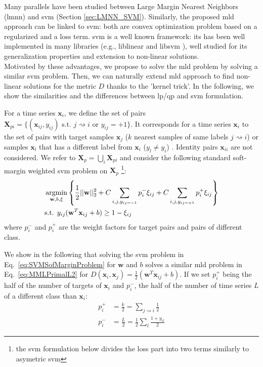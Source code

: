 Many parallels have been studied between Large Margin Nearest Neighbors ({\sc lmnn}) and {\sc svm} (Section \ref{sec:LMNN_SVM}). Similarly, the proposed {\sc mld} approach can be linked to {\sc svm}: both are convex optimization problem based on a regularized and a loss term. {\sc svm} is a well known framework: its has been well implemented in many libraries (e.g., {\sc liblinear} \cite{Fan2008} and {\sc libsvm} \cite{Hsu2008}), well studied for its generalization properties and extension to non-linear solutions. \\
\indent Motivated by these advantages, we propose to solve the {\sc mld} problem by solving a similar {\sc svm} problem. Then, we can naturally extend {\sc mld} approach to find non-linear solutions for the metric $D$ thanks to the 'kernel trick'. 
In the following, we show the similarities and the differences between {\sc lp}/{\sc qp} and {\sc svm} formulation.

For a time series $\textbf{x}_i$, we define the set of pairs $\textbf{X}_{pi}=\{(\textbf{x}_{ij},y_{ij}) \text{ s.t. } j\rightsquigarrow i \text{ or } y_{ij}=+1\}$. It corresponds for a time series $\textbf{x}_i$ to the set of pairs with target samples $\textbf{x}_j$ ($k$ nearest samples of same labels $j\rightsquigarrow i$) or samples $\textbf{x}_l$ that has a different label from $\textbf{x}_i$ ($y_l \neq y_i$) . Identity pairs $\textbf{x}_{ii}$ are not considered. We refer to $\textbf{X}_{p}=\bigcup\limits_{i} \textbf{X}_{pi}$ and consider the following standard soft-margin weighted {\sc svm} problem on $\textbf{X}_p$ \footnote{the {\sc svm} formulation below divides the loss part into two terms similarly to asymetric {\sc svm}}: 
\begin{equation}
\begin{aligned}
&\displaystyle \argmin_{\textbf{w},b,\xi} 
\left\lbrace \frac{1}{2}||\textbf{w}||_2^2
+ C \sum\limits_{i,j,y_{ij=-1}}p_i^-\xi_{ij}
+ C \sum\limits_{i,j, y_{ij=+1}}p_i^+\xi_{ij} \right\rbrace \\
& \text{s.t.  }  y_{ij}(\textbf{w}^T\textbf{x}_{ij}+b) \geq 1-\xi_{ij}
\end{aligned}
\label{eq:SVMSofMarginProblem}
\end{equation}
\noindent where $p_i^-$ and $p_i^+$ are the weight factors for target pairs and pairs of different class.

\noindent  We show in the following that solving the {\sc svm} problem in Eq.~\ref{eq:SVMSofMarginProblem} for $\textbf{w}$ and $b$ solves a similar {\sc mld} problem in Eq.~\ref{eq:MMLPrimalL2} for $D(\textbf{x}_i,\textbf{x}_j)=\frac{1}{2}(\textbf{w}^T\textbf{x}_{ij}+b)$. If we set $p_i^+$ being the half of the number of targets of $\textbf{x}_i$ and $p_i^-$, the half of the number of time series $L$ of a different class than $\textbf{x}_i$:
\begin{align}
p_i^+ &= \frac{k}{2} = \sum_{j \rightsquigarrow i} \frac{1}{2} \label{eq:pi_plus}\\
p_i^- &= \frac{L}{2} = \frac{1}{2}\sum_l \frac{1+y_{il}}{2} \label{eq:pi_moins}
\end{align}

